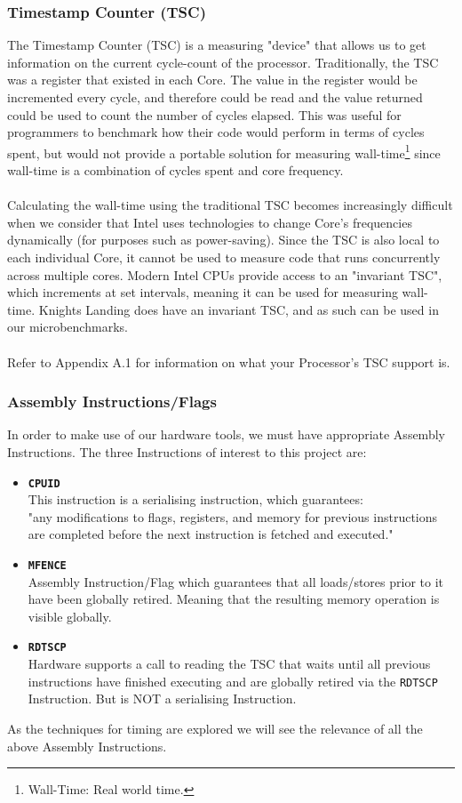 \documentclass[bsc,frontabs,twoside,singlespacing,parskip,deptreport]{infthesis}     %
\begin{document}
\subsubsection{Timestamp Counter (TSC)}
The Timestamp Counter (TSC) is a measuring "device" that allows us to get information on the current cycle-count of the processor. Traditionally, the TSC was a register that existed in each Core. The value in the register would be incremented every cycle, and therefore could be read and the value returned could be used to count the number of cycles elapsed. This was useful for programmers to benchmark how their code would perform in terms of cycles spent, but would not provide a portable solution for measuring wall-time\footnote{Wall-Time: Real world time.} since wall-time is a combination of cycles spent and core frequency. \\
\\
Calculating the wall-time using the traditional TSC becomes increasingly difficult when we consider that Intel uses technologies to change Core's frequencies dynamically (for purposes such as power-saving). Since the TSC is also local to each individual Core, it cannot be used to measure code that runs concurrently across multiple cores. Modern Intel CPUs provide access to an "invariant TSC", which increments at set intervals, meaning it can be used for measuring wall-time. Knights Landing does have an invariant TSC, and as such can be used in our microbenchmarks. \\
\\
Refer to Appendix A.1 for information on what your Processor's TSC support is.

\subsubsection{Assembly Instructions/Flags}
In order to make use of our hardware tools, we must have appropriate Assembly Instructions. The three Instructions of interest to this project are:
\begin{itemize}
    \item{
        {\bf \texttt{CPUID}\cite{cpuid_spec}} \\
        This instruction is a serialising instruction, which guarantees: \\
        "any modifications to flags, registers, and memory for previous instructions are completed before the next instruction is fetched and executed."
    }
    \item{
        {\bf \texttt{MFENCE}\cite{mfence_spec}} \\
        Assembly Instruction/Flag which guarantees that all loads/stores prior to it have been globally retired. Meaning that the resulting memory operation is visible globally.
    }
    \item{{\bf \texttt{RDTSCP}\cite{rdtscp_spec}} \\
    Hardware supports a call to reading the TSC that waits until all previous instructions have finished executing and are globally retired via the \texttt{RDTSCP} Instruction. But is NOT a serialising Instruction.}
\end{itemize}
As the techniques for timing are explored we will see the relevance of all the above Assembly Instructions.
\end{document}
